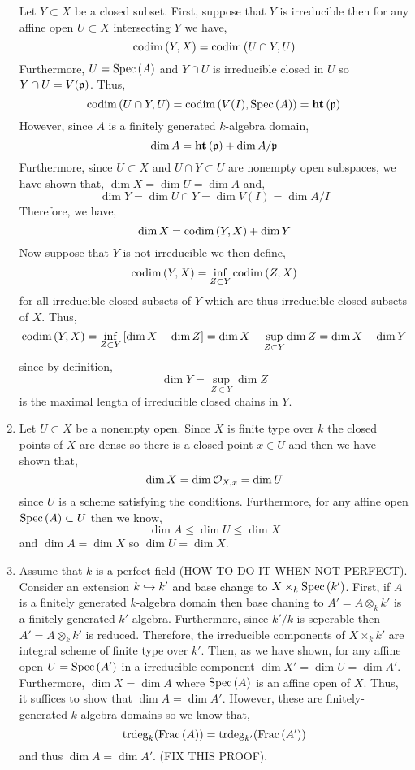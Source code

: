 \documentclass[12pt]{article}
\begin{document}
\begin{enumerate}
Let $Y \subset X$ be a closed subset. First, suppose that $Y$ is irreducible then for any affine open $U \subset X$ intersecting $Y$ we have,
\[ \mathrm{codim}\left( Y, X \right) = \mathrm{codim}\left( U \cap Y, U \right) \]
Furthermore, $U = \mathrm{Spec}\left( A \right)$ and $Y \cap U$ is irreducible closed in $U$ so $Y \cap U = V(\mathfrak{p})$. Thus,
\[ \mathrm{codim}\left( U \cap Y, U \right) = \mathrm{codim}\left( V(I), \mathrm{Spec}\left( A \right) \right) =\mathbf{ht}\left( \mathfrak{p} \right) \]
However, since $A$ is a finitely generated $k$-algebra domain,
\[ \dim{A} = \mathbf{ht}\left( \mathfrak{p} \right) + \dim{A / \mathfrak{p}} \]
Furthermore, since $U \subset X$ and  $U \cap Y \subset U$ are nonempty open subspaces, we have shown that, $\dim{X} = \dim{U} = \dim{A}$ and,
\[ \dim{Y} = \dim{U \cap Y} = \dim{V(I)} = \dim{A / I} \]
Therefore, we have,
\[ \dim{X} = \mathrm{codim}\left( Y, X \right) + \dim{Y} \]
Now suppose that $Y$ is not irreducible we then define,
\[ \mathrm{codim}\left( Y, X \right) = \inf_{Z \subset Y} \mathrm{codim}\left( Z, X \right) \]
for all irreducible closed subsets of $Y$ which are thus irreducible closed subsets of $X$. Thus,
\[ \mathrm{codim}\left( Y, X \right) = \inf_{Z \subset Y} \left[ \dim{X} -  \dim{Z} \right] = \dim{X} - \sup_{Z \subset Y} \dim{Z} = \dim{X} - \dim{Y} \]
since by definition,
\[ \dim{Y} = \sup_{Z \subset Y} \dim{Z} \]
is the maximal length of irreducible closed chains in $Y$. 

\item Let $U \subset X$ be a nonempty open. Since $X$ is finite type over $k$ the closed points of $X$ are dense so there is a closed point $x \in U$ and then we have shown that,
\[ \dim{X} = \dim{\mathcal{O}_{X, x}} = \dim{U} \]
since $U$ is a scheme satisfying the conditions. Furthermore, for any affine open $\mathrm{Spec}\left( A \right) \subset U$ then we know,
\[ \dim{A} \le \dim{U} \le \dim{X} \]
and $\dim{A} = \dim{X}$ so $\dim{U} = \dim{X}$.
  
\item Assume that $k$ is a perfect field (HOW TO DO IT WHEN NOT PERFECT). Consider an extension $k \hookrightarrow k'$ and base change to $X \times_k \mathrm{Spec}\left( k' \right)$. First, if $A$ is a finitely generated $k$-algebra domain then base chaning to $A' = A \otimes_k k'$ is a finitely generated $k'$-algebra. Furthermore, since $k' / k$ is seperable then $A' = A \otimes_k k'$ is reduced. Therefore, the irreducible components of $X \times_k k'$ are integral scheme of finite type over $k'$. Then, as we have shown, for any affine open $U = \mathrm{Spec}\left( A' \right)$ in a irreducible component $\dim{X'} = \dim{U} = \dim{A'}$. Furthermore, $\dim{X} = \dim{A}$ where $\mathrm{Spec}\left( A \right)$ is an affine open of $X$. Thus, it suffices to show that $\dim{A} = \dim{A'}$. However, these are finitely-generated $k$-algebra domains so we know that,
\[ \mathrm{trdeg}_{k}(\mathrm{Frac}\left(A\right)) = \mathrm{trdeg}_{k'}(\mathrm{Frac}\left(A'\right)) \]
and thus $\dim{A} = \dim{A'}$. (FIX THIS PROOF).
\end{enumerate}
\end{document}
